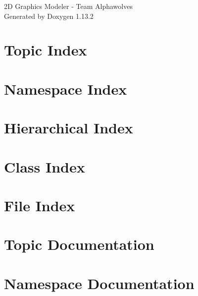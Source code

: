 \documentclass[twoside]{book}
\newcommand{\+}{\discretionary{\mbox{\scriptsize$\hookleftarrow$}}{}{}}
\newcommand{\clearemptydoublepage}{%
    \newpage{\pagestyle{empty}\cleardoublepage}%
  }
\begin{document}
  \raggedbottom
    \hypersetup{pageanchor=false,
                bookmarksnumbered=true,
                pdfencoding=unicode
               }
  \begin{titlepage}
  \vspace*{7cm}
  \begin{center}%
  {\Large 2\+D Graphics Modeler -\/ Team Alphawolves}\\
  \vspace*{1cm}
  {\large Generated by Doxygen 1.13.2}\\
  \end{center}
  \end{titlepage}
  \clearemptydoublepage
  \tableofcontents
  \clearemptydoublepage
  \hypersetup{pageanchor=true}
\chapter{Topic Index}

\chapter{Namespace Index}

\chapter{Hierarchical Index}

\chapter{Class Index}

\chapter{File Index}

\chapter{Topic Documentation}

\chapter{Namespace Documentation}



\end{document}
